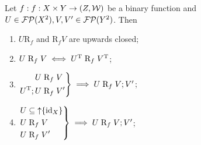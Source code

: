 \begin{lemma} \label{polarUniformityLemma}
Let $f: f: X\times Y\to \sSet{Z, \mathcal{W}}$ be a binary function and $U\in \operatorname{\mathcal{FP}}(X^2), V,V'\in \operatorname{\mathcal{FP}}(Y^2)$. Then 
\begin{enumerate}
\item $U\mathrel{\mathrm{R}_{f}}$ and $\mathrel{\mathrm{R}_{f}}V$ are upwards closed;
\item $U\mathrel{\mathrm{R}_{f}} V \iff U^{\mathrm{T}}\mathrel{\mathrm{R}_{f}} V^{\mathrm{T}}$;
\item $\left.\begin{aligned}U&\mathrel{\mathrm{R}_{f}} V \\ U^{\mathrm{T}};U&\mathrel{\mathrm{R}_{f}} V'\end{aligned}\right\} \implies U\mathrel{\mathrm{R}_{f}} V;V'$;
\item $\left.\begin{aligned}
U &\subseteq \operatorname{\uparrow}\{\operatorname{id}_X\} \\
U&\mathrel{\mathrm{R}_{f}} V \\
U&\mathrel{\mathrm{R}_{f}} V'
\end{aligned}\right\} \implies U\mathrel{\mathrm{R}_{f}} V;V'$;
\end{enumerate}
\end{lemma}
